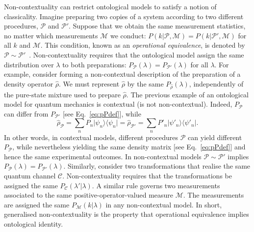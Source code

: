 \documentclass[%
 reprint,
superscriptaddress,
nofootinbib,
bibnotes,
 amsmath,amssymb,
 aps,
]{revtex4-1}
\theoremstyle{plain}
\newcommand*{\ketbra}[2]{\lvert #1 \rangle\!\langle #2 \rvert}
\begin{document}
 
 
 
Non-contextuality can 
restrict ontological models to satisfy
a notion of classicality. 
Imagine preparing two copies of a system according to two different procedures, ${\mathscr{P}}$ and ${\mathscr{P}}'$. Suppose that we obtain the same measurement statistics, no matter which measurements ${\mathscr{M}}$ we conduct: $P(k|{\mathscr{P}},{\mathscr{M}})=P(k|{\mathscr{P}}',{\mathscr{M}})$ for all $k$ and ${\mathscr{M}}$. This condition, known as an \emph{operational equivalence}, is denoted by ${\mathscr{P}} \sim {\mathscr{P}}'$~\cite{spekkens2005contextuality}. Non-contextuality requires that the ontological model assign the same distribution over $\lambda$ to both preparations: $P_{\mathscr{P}}(\lambda)=P_{{\mathscr{P}}'}(\lambda)$ for all $\lambda$. For example, consider forming a non-contextual  description of the preparation of a density operator $\hat{\rho}$. 
We must represent $\hat{\rho}$ by the same $P_{\hat{\rho}}(\lambda)$, independently of the pure-state mixture used to prepare $\hat{\rho}$. 
The previous example of an ontological model for quantum mechanics is contextual (is not non-contextual). Indeed, 
$P_{\mathscr{P}}$ can differ from $P_{{\mathscr{P}}'}$ [see Eq.~\eqref{eq:pPdef}], while 
\begin{equation}
    \hat{\rho}_{\mathscr{P}} = \sum_n P_n \ketbra{\psi_n}{\psi_n}
    = \hat{\rho}_{{\mathscr{P}}'}
    =\sum_n P'_n \ketbra{\psi'_n}{\psi'_n}.
\end{equation}
In other words, in contextual models, different procedures ${\mathscr{P}}$ can yield different $P_{\mathscr{P}}$, while nevertheless yielding the same density matrix [see Eq.~\eqref{eq:pPdef}] and hence the same experimental outcomes. In non-contextual models ${\mathscr{P}} \sim {\mathscr{P}}'$ implies $P_{\mathscr{P}}(\lambda)=P_{{\mathscr{P}}'}(\lambda)$.
Similarly, consider two transformations that realise the same quantum channel $\mathcal{C}$.
Non-contextuality requires that the transformations be assigned the same $P_{\mathcal{C}}(\lambda'|\lambda)$. 
A similar rule governs two measurements associated to the same positive-operator-valued measure $\mathcal{M}$. The measurements are assigned the same $P_{\mathcal{M}}(k|\lambda)$ in any non-contextual model.
In short, generalised non-contextuality is the property
that operational equivalence implies ontological identity.
\end{document}
